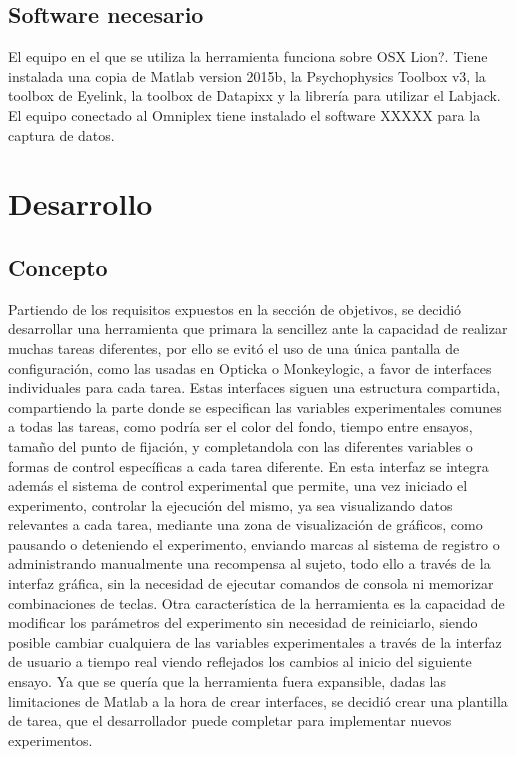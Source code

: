 \documentclass[conference]{IEEEtran}
\begin{document}
\subsection{Software necesario}
El equipo en el que se utiliza la herramienta funciona sobre OSX Lion?. Tiene instalada una copia de Matlab version 2015b, la Psychophysics Toolbox v3, la toolbox de Eyelink, la toolbox de Datapixx y la librería para utilizar el Labjack.
El equipo conectado al Omniplex tiene instalado el software XXXXX para la captura de datos.

\section{Desarrollo}
\subsection{Concepto}
 
Partiendo de los requisitos expuestos en la sección de objetivos, se decidió desarrollar una herramienta que primara la sencillez ante la capacidad de realizar muchas tareas diferentes, por ello se evitó el uso de una única pantalla de configuración, como las usadas en Opticka o Monkeylogic, a favor de interfaces individuales para cada tarea. 
Estas interfaces siguen una estructura compartida, compartiendo la parte donde se especifican las variables experimentales comunes a todas las tareas, como podría ser el color del fondo, tiempo entre ensayos, tamaño del punto de fijación, y completandola con las diferentes variables o formas de control específicas a cada tarea diferente. En esta interfaz se integra además el sistema de control experimental que permite, una vez iniciado el experimento, controlar la ejecución del mismo, ya sea visualizando datos relevantes a cada tarea, mediante una zona de visualización de gráficos, como pausando o deteniendo el experimento, enviando marcas al sistema de registro o administrando manualmente una recompensa al sujeto, todo ello a través de la interfaz gráfica, sin la necesidad de ejecutar comandos de consola ni memorizar combinaciones de teclas. 
Otra característica de la herramienta es la capacidad de modificar los parámetros del experimento sin necesidad de reiniciarlo, siendo posible cambiar cualquiera de las variables experimentales a través de la interfaz de usuario a tiempo real viendo reflejados los cambios al inicio del siguiente ensayo.
Ya que se quería que la herramienta fuera expansible, dadas las limitaciones de Matlab a la hora de crear interfaces, se decidió crear una plantilla de tarea, que el desarrollador puede completar para implementar nuevos experimentos.
\end{document}
